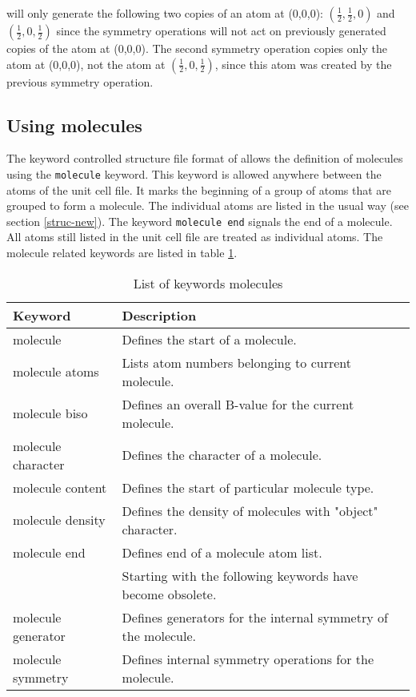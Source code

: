 will only generate the following two copies of an atom at (0,0,0):
$(\frac{1}{2}, \frac{1}{2}, 0)$ and $(\frac{1}{2}, 0, \frac{1}{2})$
since the symmetry operations will not act on previously generated
copies of the atom at (0,0,0). The second symmetry operation copies
only the atom at (0,0,0), not the atom at $(\frac{1}{2}, 0,
\frac{1}{2})$, since this atom was created by the previous symmetry
operation.


\subsection{Using molecules \label{mol}}

The keyword controlled structure file format of \Discus allows
the definition of molecules using the {\tt molecule} keyword.  This
keyword is allowed anywhere between the atoms of the unit cell file.
It marks the beginning of a group of atoms that are grouped to form
a molecule.  The individual atoms are listed in the usual way (see
section \ref{struc-new}).  The keyword {\tt molecule end} signals
the end of a molecule.  All atoms still listed in the unit cell file
are treated as individual atoms.  The molecule related keywords are
listed in table \ref{struc-mole-tab1}.

\begin{table}[!tbh]
\centering
\begin{tabularx}{\textwidth}{|p{35mm}|X|}
  \hline
  {\bf Keyword} & {\bf Description} \\
  \hline\hline
  molecule           & Defines the start of a molecule.\\
  molecule atoms     & Lists atom numbers belonging to current molecule.\\
  molecule biso      & Defines an overall B-value for the current molecule.\\
  molecule character & Defines the character of a molecule.\\
  molecule content   & Defines the start of particular molecule type.\\
  molecule density   & Defines the density of molecules with "object"
                       character.\\
  molecule end       & Defines end of a molecule atom list.\\
  \hline 
                     & Starting with \Discus 3.6 the following 
                       keywords have become obsolete.\\
  molecule generator & Defines generators for the internal symmetry of
                       the molecule.\\
  molecule symmetry  & Defines internal symmetry operations for the molecule.\\
  \hline
\end{tabularx}
\caption{\label{struc-mole-tab1} List of keywords molecules}
\end{table}

